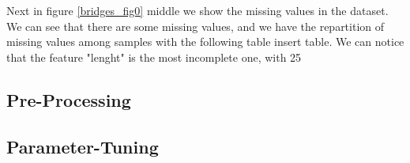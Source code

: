 \documentclass[11pt]{article}
\begin{document}
Next in figure \ref{bridges_fig0} middle we show the missing values in the dataset. We can see that there are some missing values, and we have the repartition of missing values among samples with the following table {insert table}. We can notice that the feature "lenght" is the most incomplete one, with 25%

\subsection{Pre-Processing}
%
\subsection{Parameter-Tuning}
\end{document}
